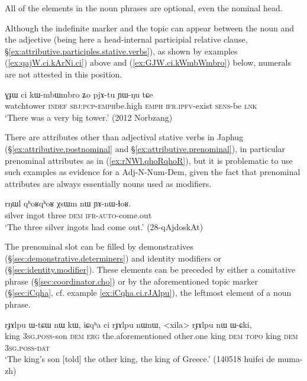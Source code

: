 All of the elements in the noun phrases are optional, even the nominal head.

Although the indefinite marker  and the topic  can appear between the noun and the adjective (being here a head-internal participial relative clause, §\ref{ex:attributive.participles.stative.verbs}), as shown by examples (\ref{ex:qajW.ci.kArNi.ci}) above and (\ref{ex:GJW.ci.kWmbWmbro}) below, numerals are not attested in this position.

\begin{exe}
\ex \label{ex:GJW.ci.kWmbWmbro}
 \gll ɣɟɯ ci kɯ-mbɯ\redp{}mbro ʑo pjɤ-tu ɲɯ-ŋu tɕe   \\
 watchtower \textsc{indef} \textsc{sbj}:\textsc{pcp}-\textsc{emph}\redp{}be.high \textsc{emph} \textsc{ifr}.\textsc{ipfv}-exist \textsc{sens}-be \textsc{lnk} \\
\glt  `There was a very big tower.' (2012 Norbzang) 	
\end{exe}

There are attributes other than adjectival stative verbs in Japhug (§\ref{ex:attributive.postnominal} and §\ref{ex:attributive.prenominal}), in particular prenominal attributes as  in (\ref{ex:rNWl.qhoRqhoR}), but it is problematic to use such examples as evidence for a Adj-N-Num-Dem, given the fact that prenominal attributes are always essentially nouns used as modifiers.

 \begin{exe}
\ex \label{ex:rNWl.qhoRqhoR}
\gll  rŋɯl qʰoʁqʰoʁ χsɯm nɯ ɲɤ-nɯ-ɬoʁ. \\
silver ingot three \textsc{dem} \textsc{ifr}-\textsc{auto}-come.out \\
\glt `The three silver ingots had come out.' (28-qAjdoskAt)
\end{exe}

The prenominal slot can be filled by demonstratives (§\ref{sec:demonstrative.determiners}) and identity modifiers  or  (§\ref{sec:identity.modifier}). These elements can be preceded by either a comitative  phrase (§\ref{sec:coordinator.cho}) or by the aforementioned topic marker  (§\ref{sec:iCqha}, cf. example \ref{ex:iCqha.ci.rJAlpu}), the leftmost element of a noun phrase.

 \begin{exe}
\ex \label{ex:iCqha.ci.rJAlpu}
\gll rɟɤlpu ɯ-tɕɯ nɯ kɯ, iɕqʰa ci rɟɤlpu nɯnɯ, <xila> rɟɤlpu nɯ ɯ-ɕki, \\
king \textsc{3sg}.\textsc{poss}-son \textsc{dem} \textsc{erg} the.aforementioned other.one king \textsc{dem}  \textsc{topo} king \textsc{dem} \textsc{3sg}.\textsc{poss}-\textsc{dat} \\
\glt `The king's son [told] the other king, the king of Greece.' (140518 huifei de muma-zh)
\end{exe}

 
